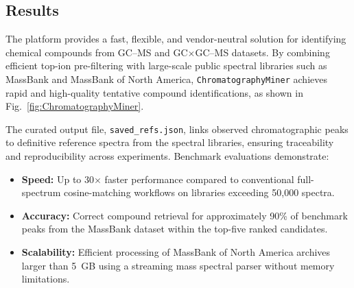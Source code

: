 \subsection*{Results}
The platform provides a fast, flexible, and vendor-neutral solution for identifying chemical compounds from GC--MS and GC$\times$GC--MS datasets. By combining efficient top-ion pre-filtering with large-scale public spectral libraries such as MassBank and MassBank of North America, \texttt{ChromatographyMiner} achieves rapid and high-quality tentative compound identifications, as shown in Fig.~\ref{fig:ChromatographyMiner}.

The curated output file, \texttt{saved\_refs.json}, links observed chromatographic peaks to definitive reference spectra from the spectral libraries, ensuring traceability and reproducibility across experiments. Benchmark evaluations demonstrate:
\begin{itemize}
    \item \textbf{Speed:} Up to 30$\times$ faster performance compared to conventional full-spectrum cosine-matching workflows on libraries exceeding 50{,}000 spectra.
    \item \textbf{Accuracy:} Correct compound retrieval for approximately 90\% of benchmark peaks from the MassBank dataset within the top-five ranked candidates.
    \item \textbf{Scalability:} Efficient processing of MassBank of North America archives larger than 5~GB using a streaming mass spectral parser without memory limitations.
\end{itemize}

%

